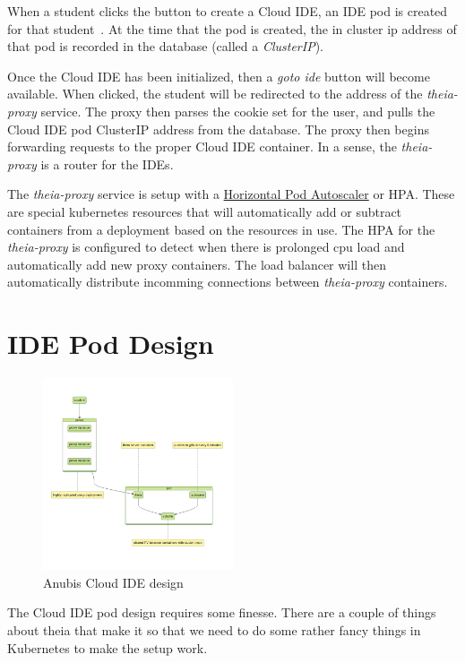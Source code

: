 When a student clicks the button to create a Cloud IDE, 
an IDE pod is created for that student~.
At the time that the pod is created, the in cluster ip address
of that pod is recorded in the database (called a \textit{ClusterIP}).

Once the Cloud IDE has been initialized, then a \textit{goto ide} button
will become available.
When clicked, the student will be redirected to the address of the \textit{theia-proxy} service.
The proxy then parses the cookie set for the user, and pulls the
Cloud IDE pod ClusterIP address from the database.
The proxy then begins forwarding requests to the proper Cloud IDE container.
In a sense, the \textit{theia-proxy} is a router for the IDEs.

The \textit{theia-proxy} service is setup with a 
\href{https://kubernetes.io/docs/tasks/run-application/horizontal-pod-autoscale/}{Horizontal Pod Autoscaler} or HPA.
These are special kubernetes resources that will automatically add or subtract containers
from a deployment based on the resources in use.
The HPA for the \textit{theia-proxy} is configured to detect when 
there is prolonged cpu load and automatically add new proxy containers.
The load balancer will then automatically distribute incomming connections
between \textit{theia-proxy} containers.

\section{IDE Pod Design}\label{sec:ide-pod-design}

\begin{figure}[ht]
    \centering
    \includegraphics[width=0.5\textwidth]{figures/theia-pod.mmd.png}
    \caption{Anubis Cloud IDE design\label{fig:anubis-ide}}
\end{figure}

The Cloud IDE pod design requires some finesse. 
There are a couple of things about theia that make it so that
we need to do some rather fancy things in Kubernetes to make 
the setup work.

